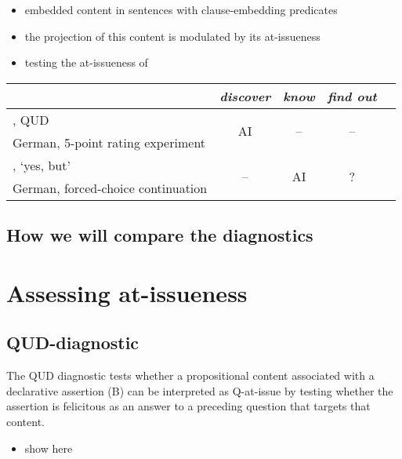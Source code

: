 \documentclass[times,linguex,xcolor]{glossa}
\begin{document}
    \begin{itemize}
      \item embedded content in sentences with clause-embedding predicates 
      \item the projection of this content is modulated by its at-issueness
      \item testing the at-issueness of 

    \end{itemize}

    \begin{tabular}{l c c c c}\toprule
            & \emph{discover}
              & \emph{know}
                & \emph{find out}
                        \\\midrule
        
        \citealt{chen_presuppositions_2024}, QUD
            & \multirow{2}{*}{AI}
              & \multirow{2}{*}{--}
                & \multirow{2}{*}{--}
                        \\ 
        \scriptsize German, 5-point rating experiment  &  \\ \midrule

        \citealt{xue_correlation_2011}, `yes, but'
            & \multirow{2}{*}{--}
              & \multirow{2}{*}{AI}
                & \multirow{2}{*}{?}
                        \\ 
        \scriptsize German, forced-choice continuation  &  \\ \midrule

    \end{tabular}

  \subsection{How we will compare the diagnostics}

\section{Assessing at-issueness}
  \subsection{QUD-diagnostic}
    The QUD diagnostic tests whether a propositional content associated with a declarative assertion (B) can be interpreted as Q-at-issue by testing whether the assertion is felicitous as an answer to a preceding question that targets that content.
    \begin{itemize}
      \item show here
    \end{itemize}
\end{document}
